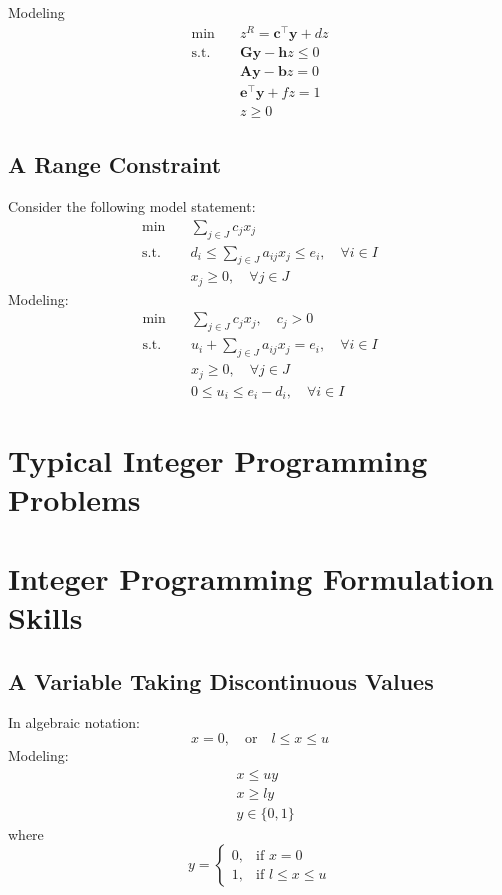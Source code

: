 				Modeling
				\begin{align}
					\min \quad & z^R = \mathbf{c^\top y} + dz\\
					\text{s.t.} \quad & \mathbf{Gy} - \mathbf{h}z \le 0\\
									  & \mathbf{Ay} - \mathbf{b}z = 0\\
									  & \mathbf{e^\top y} + fz = 1\\
									  & z \ge 0
				\end{align}

			\subsection{A Range Constraint}
				Consider the following model statement:
				\begin{align}
					\min \quad & \sum_{j\in J}c_jx_j \\
					\text{s.t.} \quad & d_i\le \sum_{j\in J}a_{ij}x_j \le e_i, \quad \forall i\in I \\
					                  & x_j \ge 0, \quad \forall j\in J 
				\end{align}
				Modeling:
				\begin{align}
					\min \quad & \sum_{j\in J}c_jx_j, \quad c_j > 0 \\
					\text{s.t.} \quad & u_i + \sum_{j\in J}a_{ij}x_j = e_i, \quad \forall i\in I \\
					                  & x_j \ge 0, \quad \forall j\in J \\
					                  & 0\le u_i \le e_i-d_i, \quad \forall i\in I 
				\end{align}

		\section{Typical Integer Programming Problems}

		\section{Integer Programming Formulation Skills}
			\subsection{A Variable Taking Discontinuous Values}
				In algebraic notation: 
				\begin{equation}
					x = 0,\quad \text{or} \quad l\le x \le u 
				\end{equation}
				Modeling:
				\begin{align}
					& x \le uy \\
					& x \ge ly  \\
					& y \in \{0, 1\} 
				\end{align}
				where
				\begin{equation}y=\begin{cases}0, & \text{if }x=0 \\ 1, & \text{if } l\le x \le u\end{cases} \end{equation}

